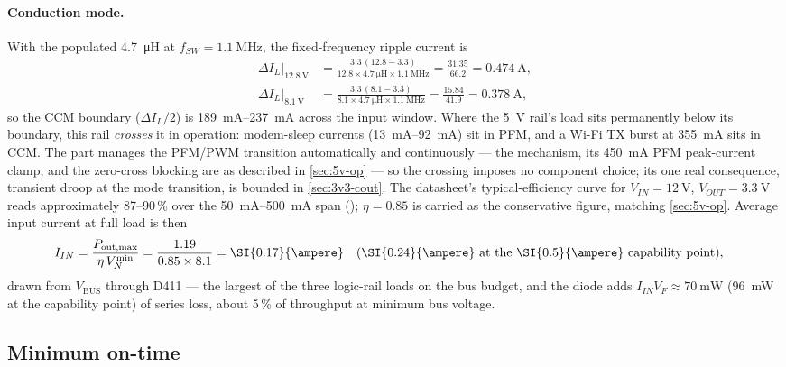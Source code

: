 \paragraph{Conduction mode.} With the populated \SI{4.7}{\micro\henry} at
$f_{SW}=\SI{1.1}{\mega\hertz}$, the fixed-frequency ripple current is
\begin{align*}
  \Delta I_L \big|_{\SI{12.8}{\volt}} &=
    \frac{3.3\,(12.8-3.3)}{12.8 \times \SI{4.7}{\micro\henry} \times \SI{1.1}{\mega\hertz}}
    = \frac{31.35}{66.2} = \SI{0.474}{\ampere}, \\
  \Delta I_L \big|_{\SI{8.1}{\volt}} &=
    \frac{3.3\,(8.1-3.3)}{8.1 \times \SI{4.7}{\micro\henry} \times \SI{1.1}{\mega\hertz}}
    = \frac{15.84}{41.9} = \SI{0.378}{\ampere},
\end{align*}
so the CCM boundary ($\Delta I_L/2$) is \SIrange{189}{237}{\milli\ampere} across the
input window. Where the 5~V rail's load sits permanently below its boundary, this rail
\emph{crosses} it in operation: modem-sleep currents (\SIrange{13}{92}{\milli\ampere})
sit in PFM, and a Wi-Fi TX burst at \SI{355}{\milli\ampere} sits in CCM. The part
manages the PFM/PWM transition automatically and continuously --- the mechanism, its
\SI{450}{\milli\ampere} PFM peak-current clamp, and the zero-cross blocking are as
described in \cref{sec:5v-op} --- so the crossing imposes no component choice; its one
real consequence, transient droop at the mode transition, is bounded in
\cref{sec:3v3-cout}. The datasheet's typical-efficiency curve for
$V_{IN}=\SI{12}{\volt}$, $V_{OUT}=\SI{3.3}{\volt}$ reads approximately 87--90\,\% over
the \SIrange{50}{500}{\milli\ampere} span (); $\eta=0.85$ is carried
as the conservative figure, matching \cref{sec:5v-op}. Average input current at full
load is then
\begin{align*}
  I_{IN} &= \frac{P_{\mathrm{out,max}}}{\eta\,V_N^{\min}}
          = \frac{1.19}{0.85 \times 8.1} = \SI{0.17}{\ampere}
  \quad (\SI{0.24}{\ampere}\ \text{at the \SI{0.5}{\ampere} capability point}),
\end{align*}
drawn from $V_{\mathrm{BUS}}$ through D411 --- the largest of the three logic-rail
loads on the bus budget, and the diode adds $I_{IN} V_F \approx \SI{70}{\milli\watt}$
(\SI{96}{\milli\watt} at the capability point) of series loss, about 5\,\% of
throughput at minimum bus voltage.

\subsection{Minimum on-time}\label{sec:3v3-ontime}

